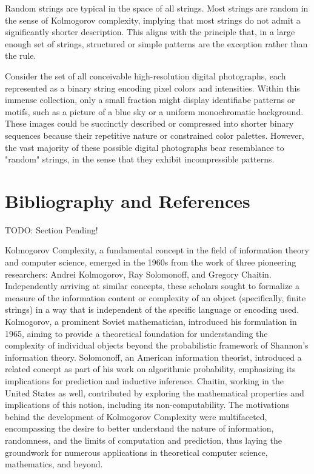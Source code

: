 Random strings are typical in the space of all strings. Most strings are random in the sense of Kolmogorov complexity, implying that most strings do not admit a significantly shorter description. This aligns with the principle that, in a large enough set of strings, structured or simple patterns are the exception rather than the rule.

\begin{example}
Consider the set of all conceivable high-resolution digital photographs, each represented as a binary string encoding pixel colors and intensities. Within this immense collection, only a small fraction might display identifiabe patterns or motifs, such as a picture of a blue sky or a uniform monochromatic background. These images could be succinctly described or compressed into shorter binary sequences because their repetitive nature or constrained color palettes. However, the vast majority of these possible digital photographs bear resemblance to "random" strings, in the sense that they exhibit incompressible patterns.
\end{example}

%
%

\section*{Bibliography and References}

{\color{red} TODO: Section Pending!}

{\color{red} Kolmogorov Complexity, a fundamental concept in the field of information theory and computer science, emerged in the 1960s from the work of three pioneering researchers: Andrei Kolmogorov, Ray Solomonoff, and Gregory Chaitin. Independently arriving at similar concepts, these scholars sought to formalize a measure of the information content or complexity of an object (specifically, finite strings) in a way that is independent of the specific language or encoding used. Kolmogorov, a prominent Soviet mathematician, introduced his formulation in 1965, aiming to provide a theoretical foundation for understanding the complexity of individual objects beyond the probabilistic framework of Shannon's information theory. Solomonoff, an American information theorist, introduced a related concept as part of his work on algorithmic probability, emphasizing its implications for prediction and inductive inference. Chaitin, working in the United States as well, contributed by exploring the mathematical properties and implications of this notion, including its non-computability. The motivations behind the development of Kolmogorov Complexity were multifaceted, encompassing the desire to better understand the nature of information, randomness, and the limits of computation and prediction, thus laying the groundwork for numerous applications in theoretical computer science, mathematics, and beyond. }


